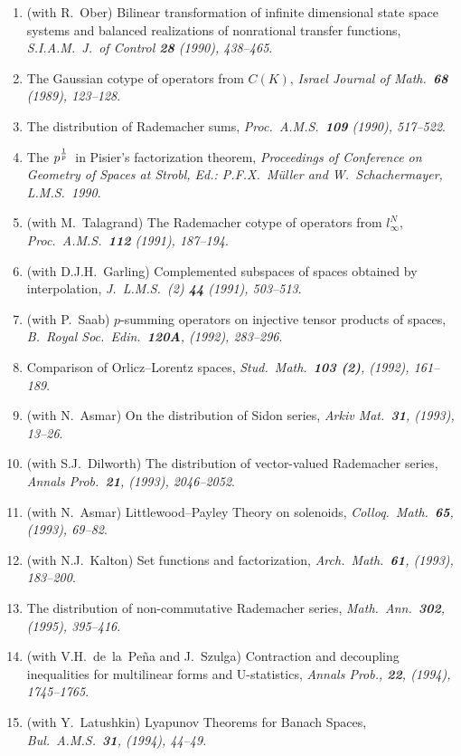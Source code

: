\documentclass{article}
\begin{document}
\begin{enumerate}
\item (with R.~Ober) Bilinear transformation of infinite dimensional state
space systems
and balanced realizations of nonrational transfer functions, {\em 
S.I.A.M.\ J.\ of Control {\bf 28} (1990), 438--465}.
\item The Gaussian cotype of operators from $C(K)$, {\em Israel
Journal of Math.\ {\bf 68} (1989), 123--128}.
\item The distribution of Rademacher sums, {\em 
Proc.\ A.M.S.\ {\bf 109}
(1990), 517--522}.
\item The $p^{1\over p}$\ in Pisier's factorization
theorem, {\em 
Proceedings of Conference on Geometry of Spaces at Strobl, Ed.: 
P.F.X.~M\"uller and W.~Schachermayer, L.M.S.\ 1990}.
\item (with M.~Talagrand) The Rademacher cotype of operators from
$l_\infty^N$, {\em Proc.\ A.M.S.\ {\bf 112} (1991), 187--194}.
\item (with D.J.H.~Garling) Complemented subspaces of spaces
obtained by interpolation, {\em J.\ L.M.S.\ (2) {\bf 44} (1991), 
503--513}.
\item (with P.~Saab) $p$-summing operators on injective tensor
products of spaces, {\em B.\ Royal Soc.\ Edin.\ {\bf 120A}, (1992), 
283--296}.
\item Comparison of Orlicz--Lorentz spaces, {\em 
Stud.\ Math.\ {\bf 103 (2)}, (1992), 161--189}.
\item (with N.~Asmar) On the distribution of 
Sidon series, {\em Arkiv Mat.\ {\bf 31}, (1993), 13--26}.
\item (with S.J.~Dilworth)
The distribution of vector-valued Rademacher series, {\em Annals Prob.\
{\bf 21}, (1993), 2046--2052}.
\item (with N.~Asmar) Littlewood--Payley Theory on solenoids, {\em
Colloq.\ Math.\ {\bf 65}, (1993), 69--82}.
\item (with N.J.~Kalton) Set functions and factorization, {\em
Arch.\ Math.\ {\bf 61}, (1993), 183--200}.
\item The distribution of non-commutative Rademacher series, {\em
Math.\ Ann.\ {\bf 302}, (1995), 395--416}.
\item (with V.H.~de~la~Pe\~na and J.~Szulga) 
Contraction and decoupling inequalities for  
multilinear forms and U-statistics, {\em
Annals Prob., {\bf 22}, (1994), 1745--1765}.
\item (with Y.~Latushkin) Lyapunov Theorems for Banach Spaces, {\em
Bul.\ A.M.S.\ {\bf 31}, (1994), 44--49}.

\end{enumerate}
\end{document}
